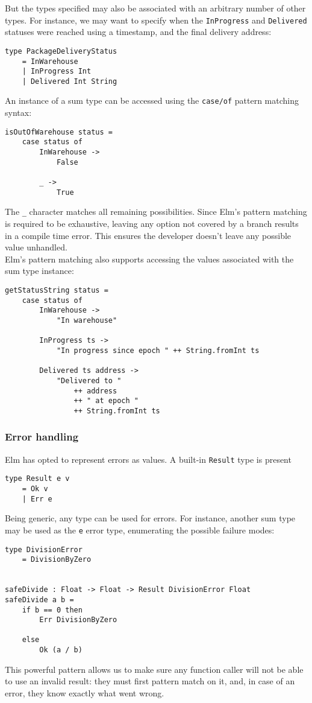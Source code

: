 But the types specified may also be associated with an arbitrary number of other types. For instance, we may want to specify when the \texttt{InProgress} and \texttt{Delivered} statuses were reached using a timestamp, and the final delivery address:
\begin{verbatim}
type PackageDeliveryStatus
    = InWarehouse
    | InProgress Int
    | Delivered Int String
\end{verbatim}

An instance of a sum type can be accessed using the \texttt{case/of} pattern matching syntax:
\begin{verbatim}
isOutOfWarehouse status =
    case status of
        InWarehouse ->
            False

        _ ->
            True
\end{verbatim}

The \texttt{\_} character matches all remaining possibilities. Since Elm's pattern matching is required to be exhaustive, leaving any option not covered by a branch results in a compile time error. This ensures the developer doesn't leave any possible value unhandled.\\

Elm's pattern matching also supports accessing the values associated with the sum type instance:
\begin{verbatim}
getStatusString status =
    case status of
        InWarehouse ->
            "In warehouse"

        InProgress ts ->
            "In progress since epoch " ++ String.fromInt ts

        Delivered ts address ->
            "Delivered to "
                ++ address
                ++ " at epoch "
                ++ String.fromInt ts
\end{verbatim}

\subsubsection{Error handling}
Elm has opted to represent errors as values. A built-in \texttt{Result} type is present
\begin{verbatim}
type Result e v
    = Ok v
    | Err e
\end{verbatim}

Being generic, any type can be used for errors. For instance, another sum type may be used as the \texttt{e} error type, enumerating the possible failure modes:
\begin{verbatim}
type DivisionError
    = DivisionByZero


safeDivide : Float -> Float -> Result DivisionError Float
safeDivide a b =
    if b == 0 then
        Err DivisionByZero

    else
        Ok (a / b)
\end{verbatim}
This powerful pattern allows us to make sure any function caller will not be able to use an invalid result: they must first pattern match on it, and, in case of an error, they know exactly what went wrong.\\

